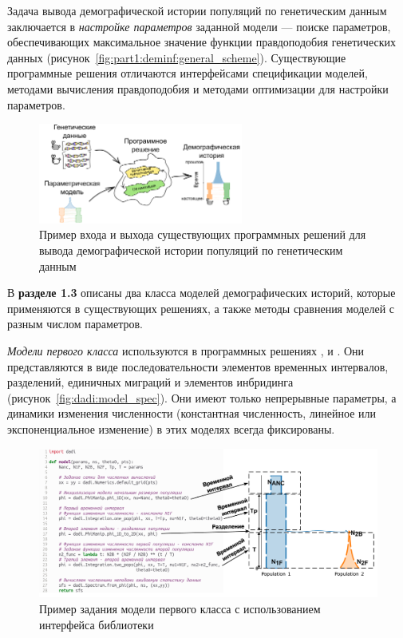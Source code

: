 Задача вывода демографической истории популяций по генетическим данным заключается в \textit{настройке параметров} заданной модели --- поиске параметров, обеспечивающих максимальное значение функции правдоподобия генетических данных (рисунок~\ref{fig:part1:deminf:general_scheme}).
Существующие программные решения отличаются интерфейсами спецификации моделей, методами вычисления правдоподобия и методами оптимизации для настройки параметров.

\begin{figure}[ht]
    \includegraphics[width=0.6\textwidth]{images/part1/dem_history/general_scheme.pdf}
    \caption{Пример входа и выхода существующих программных решений для вывода демографической истории популяций по генетическим данным}
\end{figure}


В \textbf{разделе 1.3} описаны два класса моделей демографических историй, которые применяются в существующих решениях, а также методы сравнения моделей с разным числом параметров.

\textit{Модели первого класса} используются в программных решениях \dadi, \moments и \momentsLD.
Они представляются в виде последовательности элементов временных интервалов, разделений, единичных миграций и элементов инбридинга (рисунок~\ref{fig:dadi:model_spec}).
Они имеют только непрерывные параметры, а динамики изменения численности (константная численность, линейное или экспоненциальное изменение) в этих моделях всегда фиксированы.

\begin{figure}[b]
    \centering
    \includegraphics[width=\linewidth]{images_2/dadi_model.pdf}
    \caption{Пример задания модели первого класса с использованием интерфейса библиотеки~\dadi}
\end{figure}


